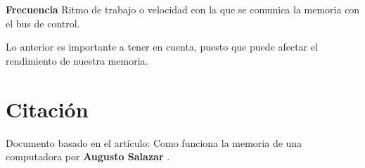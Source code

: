 \documentclass{article}
\begin{document}
\begin{tcolorbox}[colupper=red!75!black]
	\textbf{Frecuencia}
	\tcblower
	Ritmo de trabajo o velocidad con la que se comunica la memoria con el bus de control.
\end{tcolorbox}
Lo anterior es importante a tener en cuenta, puesto que puede afectar el rendimiento de nuestra memoria.

\section{Citación}
Documento basado en el artículo: Como funciona la memoria de una computadora por \textbf{Augusto Salazar} \cite{Salazar}.



\end{document}
